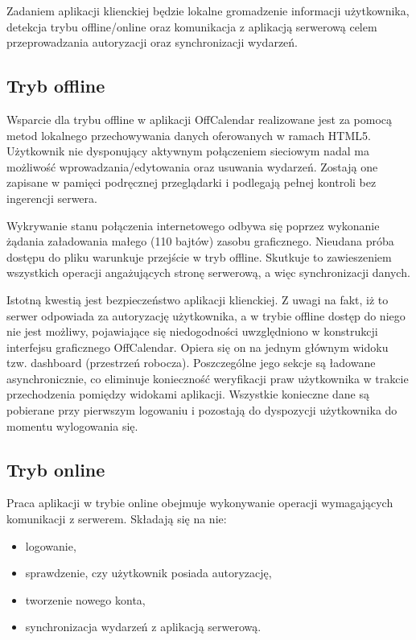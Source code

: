 Zadaniem aplikacji klienckiej będzie lokalne gromadzenie informacji użytkownika, detekcja trybu offline/online oraz komunikacja z aplikacją serwerową celem przeprowadzania autoryzacji oraz synchronizacji wydarzeń.

\subsection{Tryb offline}
\label{trybOff}

Wsparcie dla trybu offline w aplikacji OffCalendar realizowane jest za pomocą metod lokalnego przechowywania danych oferowanych w ramach HTML5. Użytkownik nie dysponujący aktywnym połączeniem sieciowym nadal ma możliwość wprowadzania/edytowania oraz usuwania wydarzeń. Zostają one zapisane w pamięci podręcznej przeglądarki i podlegają pełnej kontroli bez ingerencji serwera.

Wykrywanie stanu połączenia internetowego odbywa się poprzez wykonanie żądania załadowania małego (110 bajtów) zasobu graficznego. Nieudana próba dostępu do pliku warunkuje przejście w tryb offline. Skutkuje to zawieszeniem wszystkich operacji angażujących stronę serwerową, a więc synchronizacji danych.
	
Istotną kwestią jest bezpieczeństwo aplikacji klienckiej. Z uwagi na fakt, iż to serwer odpowiada za autoryzację użytkownika, a w trybie offline dostęp do niego nie jest możliwy, pojawiające się niedogodności uwzględniono w konstrukcji interfejsu graficznego OffCalendar. Opiera się on na jednym głównym widoku tzw. dashboard (przestrzeń robocza). Poszczególne jego sekcje są ładowane asynchronicznie, co eliminuje konieczność weryfikacji praw użytkownika w trakcie przechodzenia pomiędzy widokami aplikacji. Wszystkie konieczne dane są pobierane przy pierwszym logowaniu i pozostają do dyspozycji użytkownika do momentu wylogowania się.

\subsection{Tryb online}
\label{trybOn}

Praca aplikacji w trybie online obejmuje wykonywanie operacji wymagających komunikacji z serwerem. Składają się na nie:

\begin{itemize}
\item logowanie,
\item sprawdzenie, czy użytkownik posiada autoryzację,
\item tworzenie nowego konta,
\item synchronizacja wydarzeń z aplikacją serwerową.
\end{itemize}

